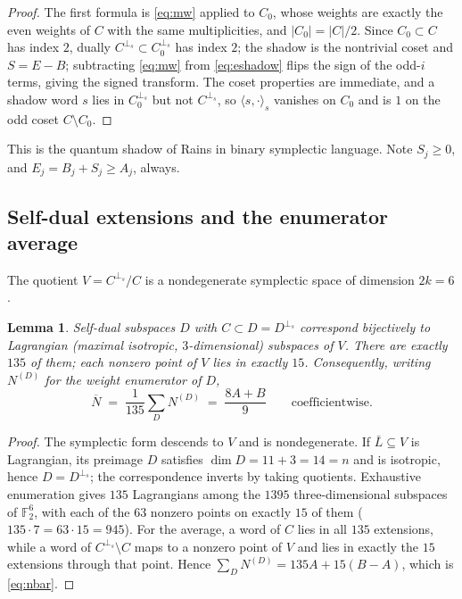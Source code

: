 \documentclass[11pt]{amsart}
\newtheorem{lemma}[theorem]{Lemma}
\theoremstyle{definition}
\theoremstyle{remark}
\newcommand{\F}{\mathbb{F}}
\newcommand{\perps}{{\perp_s}}
\newcommand{\sform}[2]{\langle #1,#2\rangle_s}
\begin{document}
\begin{proof}
The first formula is \eqref{eq:mw} applied to $C_0$, whose weights are
exactly the even weights of $C$ with the same multiplicities, and
$|C_0|=|C|/2$.  Since $C_0\subset C$ has index $2$, dually
$C^{\perps}\subset C_0^{\perps}$ has index $2$; the shadow is the
nontrivial coset and $S=E-B$; subtracting \eqref{eq:mw} from
\eqref{eq:eshadow} flips the sign of the odd-$i$ terms, giving the signed
transform.  The coset properties
are immediate, and a shadow word $s$ lies in $C_0^{\perps}$ but not
$C^{\perps}$, so $\sform{s}{\cdot}$ vanishes on $C_0$ and is $1$ on the odd
coset $C\setminus C_0$.
\end{proof}

This is the quantum shadow of Rains \cite{Rains1999Shadow} in binary symplectic
language.  Note $S_j\ge0$, and $E_j=B_j+S_j\ge A_j$, always.

\subsection{Self-dual extensions and the enumerator average}

The quotient $V=C^{\perps}/C$ is a nondegenerate symplectic space of
dimension $2k=6$.

\begin{lemma}\label{lem:ext}
Self-dual subspaces $D$ with $C\subset D=D^{\perps}$ correspond bijectively
to Lagrangian (maximal isotropic, $3$-dimensional) subspaces of $V$.
There are exactly $135$ of them; each nonzero point of $V$ lies in exactly
$15$.  Consequently, writing $N^{(D)}$ for the weight enumerator of $D$,
\begin{equation}\label{eq:nbar}
\overline N \;=\;\frac{1}{135}\sum_{D}N^{(D)}\;=\;\frac{8A+B}{9}
\qquad\text{coefficientwise.}
\end{equation}
\end{lemma}

\begin{proof}
The symplectic form descends to $V$ and is nondegenerate.  If
$\bar L\subseteq V$ is Lagrangian, its preimage $D$ satisfies
$\dim D=11+3=14=n$ and is isotropic, hence $D=D^{\perps}$; the
correspondence inverts by taking quotients.  Exhaustive enumeration gives
$135$ Lagrangians among the $1395$ three-dimensional subspaces of $\F_2^6$,
with each of the $63$ nonzero points on exactly $15$ of them
($135\cdot 7=63\cdot 15=945$).  For the average, a word of $C$ lies in all
$135$ extensions, while a word of $C^{\perps}\setminus C$ maps to a
nonzero point of $V$ and lies in exactly the $15$ extensions through that
point.  Hence
$\sum_D N^{(D)}=135A+15(B-A)$, which is \eqref{eq:nbar}.
\end{proof}
\end{document}
